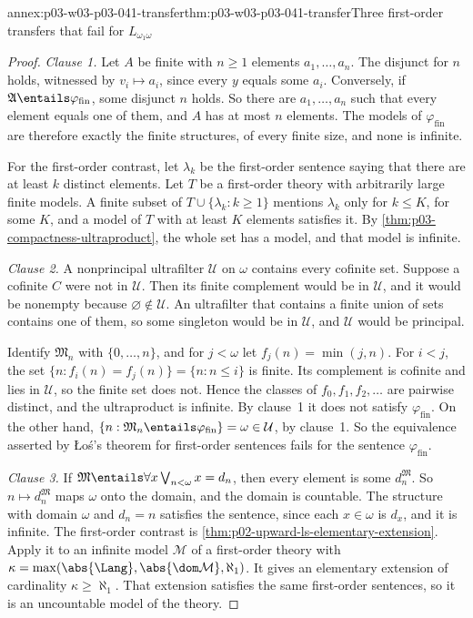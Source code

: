\begin{annexitem}{annex:p03-w03-p03-041-transfer}{thm:p03-w03-p03-041-transfer}{Three first-order transfers that fail for \(L_{\omega_1\omega}\)}
\begin{proof}
\emph{Clause 1.} Let \(A\) be finite with \(n\geq1\) elements
\(a_1,\ldots,a_n\). The disjunct for \(n\) holds, witnessed by
\(v_i\mapsto a_i\), since every \(y\) equals some \(a_i\). Conversely, if
\(\mathfrak A\entails\varphi_{\mathrm{fin}}\), some disjunct \(n\) holds.
So there are \(a_1,\ldots,a_n\) such that every element equals one of
them, and \(A\) has at most \(n\) elements. The models of
\(\varphi_{\mathrm{fin}}\) are therefore exactly the finite structures, of
every finite size, and none is infinite.

For the first-order contrast, let \(\lambda_k\) be the first-order sentence
saying that there are at least \(k\) distinct elements. Let \(T\) be a
first-order theory with arbitrarily large finite models. A finite subset
of \(T\cup\{\lambda_k:k\geq1\}\) mentions \(\lambda_k\) only for
\(k\leq K\), for some \(K\), and a model of \(T\) with at least \(K\)
elements satisfies it. By \cref{thm:p03-compactness-ultraproduct}, the
whole set has a model, and that model is infinite.

\emph{Clause 2.} A nonprincipal ultrafilter \(\mathcal U\) on \(\omega\)
contains every cofinite set. Suppose a cofinite \(C\) were not in
\(\mathcal U\). Then its finite complement would be in \(\mathcal U\),
and it would be nonempty because \(\varnothing\notin\mathcal U\). An
ultrafilter that contains a finite union of sets contains one of them, so
some singleton would be in \(\mathcal U\), and \(\mathcal U\) would be
principal.

Identify \(\mathfrak M_n\) with \(\{0,\ldots,n\}\), and for \(j<\omega\) let
\(f_j(n)=\min(j,n)\). For \(i<j\), the set
\(\{n:f_i(n)=f_j(n)\}=\{n:n\leq i\}\) is finite. Its complement is cofinite
and lies in \(\mathcal U\), so the finite set does not. Hence the classes of
\(f_0,f_1,f_2,\ldots\) are pairwise distinct, and the ultraproduct is
infinite. By clause~1 it does not satisfy \(\varphi_{\mathrm{fin}}\). On
the other hand,
\(\{n:\mathfrak M_n\entails\varphi_{\mathrm{fin}}\}=\omega\in\mathcal U\),
by clause~1. So the equivalence asserted by \L o\'s's theorem for
first-order sentences fails for the sentence \(\varphi_{\mathrm{fin}}\).

\emph{Clause 3.} If \(\mathfrak M\entails\forall x\bigvee_{n<\omega}x=d_n\),
then every element is some \(d_n^{\mathfrak M}\). So
\(n\mapsto d_n^{\mathfrak M}\) maps \(\omega\) onto the domain, and the
domain is countable. The structure with domain \(\omega\) and
\(d_n=n\) satisfies the sentence, since each \(x\in\omega\) is
\(d_x\), and it is infinite. The first-order contrast is
\cref{thm:p02-upward-ls-elementary-extension}. Apply it to an infinite model
\(\mathcal M\) of a first-order theory with
\(\kappa=\max(\abs{\Lang},\abs{\dom\mathcal M},\aleph_1)\). It gives an
elementary extension of cardinality \(\kappa\geq\aleph_1\). That extension
satisfies the same first-order sentences, so it is an uncountable model of
the theory.
\end{proof}
\end{annexitem}

